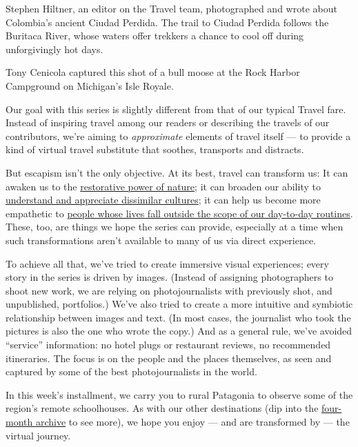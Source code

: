 Stephen Hiltner, an editor on the Travel team, photographed and wrote
about Colombia's ancient Ciudad Perdida. The trail to Ciudad Perdida
follows the Buritaca River, whose waters offer trekkers a chance to cool
off during unforgivingly hot days.

Tony Cenicola captured this shot of a bull moose at the Rock Harbor
Campground on Michigan's Isle Royale.

Our goal with this series is slightly different from that of our typical
Travel fare. Instead of inspiring travel among our readers or describing
the travels of our contributors, we're aiming to \emph{approximate}
elements of travel itself --- to provide a kind of virtual travel
substitute that soothes, transports and distracts.

But escapism isn't the only objective. At its best, travel can transform
us: It can awaken us to the
\href{https://www.nytimes.com/2020/06/24/travel/dolomites-italy-hut-hiking.html}{restorative
power of nature}; it can broaden our ability to
\href{https://www.nytimes.com/2020/06/08/travel/lens-sheep-island-maine.html}{understand
and appreciate dissimilar cultures}; it can help us become more
empathetic to
\href{https://www.nytimes.com/2020/06/15/travel/gujarat-india-portraits.html}{people
whose lives fall outside the scope of our day-to-day routines}. These,
too, are things we hope the series can provide, especially at a time
when such transformations aren't available to many of us via direct
experience.

To achieve all that, we've tried to create immersive visual experiences;
every story in the series is driven by images. (Instead of assigning
photographers to shoot new work, we are relying on photojournalists with
previously shot, and unpublished, portfolios.) We've also tried to
create a more intuitive and symbiotic relationship between images and
text. (In most cases, the journalist who took the pictures is also the
one who wrote the copy.) And as a general rule, we've avoided
``service'' information: no hotel plugs or restaurant reviews, no
recommended itineraries. The focus is on the people and the places
themselves, as seen and captured by some of the best photojournalists in
the world.

In this week's installment, we carry you to rural Patagonia to observe
some of the region's remote schoolhouses. As with our other destinations
(dip into the
\href{https://www.nytimes.com/column/the-world-through-a-lens}{four-month
archive} to see more), we hope you enjoy --- and are transformed by ---
the virtual journey.

